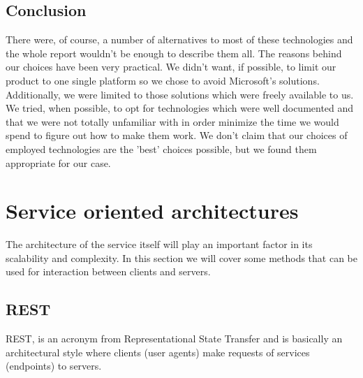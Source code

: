 \subsection{Conclusion}

There were, of course, a number of alternatives to most of these technologies and the whole
report wouldn't be enough to describe them all. The reasons behind our choices have been very practical.
We didn't want, if possible, to limit our product to one single platform so we chose to avoid Microsoft's solutions.
Additionally, we were limited to those solutions which were freely available to us.
We tried, when possible, to opt for technologies which were well documented and that we were not
totally unfamiliar with in order minimize the time we would spend to figure out how to make them work.
We don't claim that our choices of employed technologies are the 'best' choices possible,
but we found them appropriate for our case.

\section{Service oriented architectures}

The architecture of the service itself will play an important factor in its scalability and complexity.
In this section we will cover some methods that can be used for interaction between clients and servers. 

\subsection{REST}
\label{subsec:rest}

\cite{REST} REST, is an acronym from Representational State Transfer and is basically an architectural style where clients
(user agents) make requests of services (endpoints) to servers.

